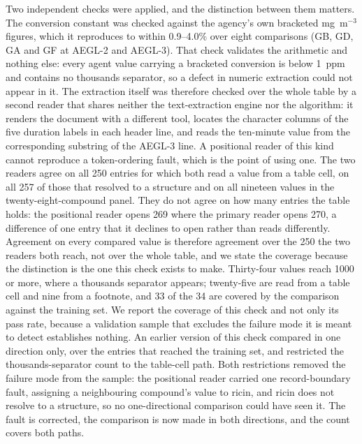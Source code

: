 \documentclass[journal=jacsat,manuscript=suppinfo,margin=1in]{achemso}
\begin{document}
Two independent checks were applied, and the distinction between them matters.
The conversion constant was checked against the agency's own bracketed
mg~m$^{-3}$ figures, which it reproduces to within 0.9--4.0\% over eight
comparisons (GB, GD, GA and GF at AEGL-2 and AEGL-3). That check validates the
arithmetic and nothing else: every agent value carrying a bracketed conversion is
below 1~ppm and contains no thousands separator, so a defect in numeric
extraction could not appear in it. The extraction itself was therefore checked
over the whole table by a second reader that shares neither the text-extraction
engine nor the algorithm: it renders the document with a different tool, locates
the character columns of the five duration labels in each header line, and reads
the ten-minute value from the corresponding substring of the AEGL-3 line. A
positional reader of this kind cannot reproduce a token-ordering fault, which is
the point of using one. The two readers agree on all 250 entries for which both
read a value from a table cell, on all 257 of
those that resolved to a structure and on all nineteen values in the
twenty-eight-compound panel. They do not agree on how many entries the table
holds: the positional reader opens 269 where the primary reader opens 270, a
difference of one entry that it declines to open rather than reads differently.
Agreement on every compared value is therefore agreement over the 250 the two
readers both reach, not over the whole table, and we state the coverage because
the distinction is the one this check exists to make. Thirty-four values reach 1000 or more, where a
thousands separator appears; twenty-five are read from a table cell and nine
from a footnote, and 33 of the 34 are covered by the comparison against the
training set. We report the coverage of this check
and not only its pass rate, because a validation sample that excludes the failure
mode it is meant to detect establishes nothing. An earlier version of this check
compared in one direction only, over the entries that reached the training set,
and restricted the thousands-separator count to the table-cell path. Both
restrictions removed the failure mode from the sample: the positional reader
carried one record-boundary fault, assigning a neighbouring compound's value to
ricin, and ricin does not resolve to a structure, so no one-directional
comparison could have seen it. The fault is corrected, the comparison is now
made in both directions, and the count covers both paths.
\end{document}
